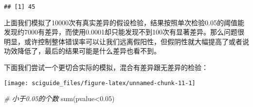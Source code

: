 \documentclass[]{tufte-book}
\newenvironment{Shaded}{}{}
\newcommand{\CommentTok}[1]{\textcolor[rgb]{0.38,0.63,0.69}{\textit{#1}}}
\newcommand{\ConstantTok}[1]{\textcolor[rgb]{0.53,0.00,0.00}{#1}}
\newcommand{\ControlFlowTok}[1]{\textcolor[rgb]{0.00,0.44,0.13}{\textbf{#1}}}
\newcommand{\DecValTok}[1]{\textcolor[rgb]{0.25,0.63,0.44}{#1}}
\newcommand{\FloatTok}[1]{\textcolor[rgb]{0.25,0.63,0.44}{#1}}
\newcommand{\FunctionTok}[1]{\textcolor[rgb]{0.02,0.16,0.49}{#1}}
\newcommand{\NormalTok}[1]{#1}
\newcommand{\OtherTok}[1]{\textcolor[rgb]{0.00,0.44,0.13}{#1}}
\newcommand{\SpecialCharTok}[1]{\textcolor[rgb]{0.25,0.44,0.63}{#1}}
\begin{document}
\begin{verbatim}
## [1] 45
\end{verbatim}

上面我们模拟了10000次有真实差异的假设检验，结果按照单次检验0.05的阈值能发现约7000有差异，而使用0.0001却只能发现不到100次有显著差异。那么问题很明显，或许控制整体错误率可以让我们远离假阳性，但假阴性就大幅提高了或者说功效降低了，最后的结果可能是什么差异也看不到。

下面我们尝试一个更切合实际的模拟，混合有差异跟无差异的检验：

\begin{Shaded}
\end{Shaded}

\texttt{[image: sciguide\_files/figure-latex/unnamed-chunk-11-1]}

\begin{Shaded}
\begin{Highlighting}[]
\CommentTok{\# 小于0.05的个数}
\FunctionTok{sum}\NormalTok{(pvalue}\SpecialCharTok{\textless{}}\FloatTok{0.05}\NormalTok{)}
\end{Highlighting}
\end{Shaded}
\end{document}
